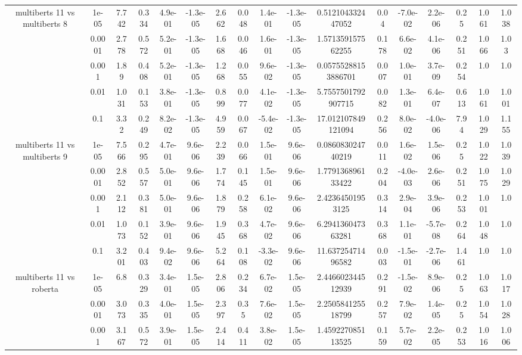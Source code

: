 \begin{tabular}{|c|c|c|c|c|c|c|c|c|c|c|c|c|c|c|c|c|}
\hline
\multirow{5}{*}{multiberts 11 vs multiberts 8} & 1e-05 & 7.742 & 0.334 & 4.9e-01 & -1.3e-05 & 2.662 & 0.048 & 1.4e-01 & -1.3e-05 & 0.512104332447052 & 0.04 & -7.0e-02 & 2.2e-06 & 0.25 & 1.061 & 1.038 \\
 & 0.0001 & 2.778 & 0.572 & 5.2e-01 & -1.3e-05 & 1.668 & 0.046 & 1.6e-01 & -1.3e-05 & 1.571359157562255 & 0.178 & 6.6e-02 & 4.1e-06 & 0.251 & 1.066 & 1.03 \\
 & 0.001 & 1.89 & 0.408 & 5.2e-01 & -1.3e-05 & 1.268 & 0.055 & 9.6e-02 & -1.3e-05 & 0.05755288153886701 & 0.007 & 1.0e-01 & 3.7e-09 & 0.254 & 1.0 & 1.0 \\
 & 0.01 & 1.031 & 0.153 & 3.8e-01 & -1.3e-05 & 0.899 & 0.077 & 4.1e-02 & -1.3e-05 & 5.7557501792907715 & 0.082 & 1.3e-01 & 6.4e-07 & 0.613 & 1.061 & 1.001 \\
 & 0.1 & 3.32 & 0.249 & 8.2e-02 & -1.3e-05 & 4.959 & 0.067 & -5.4e-02 & -1.3e-05 & 17.012107849121094 & 0.256 & 8.0e-02 & -4.0e-06 & 7.94 & 1.029 & 1.155 \\
\hline
\multirow{5}{*}{multiberts 11 vs multiberts 9} & 1e-05 & 7.566 & 0.295 & 4.7e-01 & 9.6e-06 & 2.239 & 0.066 & 1.5e-01 & 9.6e-06 & 0.086083024740219 & 0.011 & 1.6e-02 & 1.5e-06 & 0.25 & 1.022 & 1.039 \\
 & 0.0001 & 2.852 & 0.557 & 5.0e-01 & 9.6e-06 & 1.774 & 0.145 & 1.5e-01 & 9.6e-06 & 1.779136896133422 & 0.204 & -4.0e-03 & 2.6e-06 & 0.251 & 1.075 & 1.029 \\
 & 0.001 & 2.112 & 0.381 & 5.0e-01 & 9.6e-06 & 1.879 & 0.258 & 6.1e-02 & 9.6e-06 & 2.42364501953125 & 0.314 & 2.9e-04 & 3.9e-06 & 0.253 & 1.001 & 1.0 \\
 & 0.01 & 1.073 & 0.152 & 3.9e-01 & 9.6e-06 & 1.945 & 0.368 & 4.7e-02 & 9.6e-06 & 6.294136047363281 & 0.368 & 1.1e-01 & -5.7e-08 & 0.264 & 1.048 & 1.0 \\
 & 0.1 & 3.201 & 0.403 & 9.4e-02 & 9.6e-06 & 5.264 & 0.108 & -3.3e-02 & 9.6e-06 & 11.63725471496582 & 0.003 & -1.5e-01 & -2.7e-06 & 1.461 & 1.0 & 1.0 \\
\hline
\multirow{5}{*}{multiberts 11 vs roberta } & 1e-05 & 6.8 & 0.329 & 3.4e-01 & 1.5e-05 & 2.806 & 0.234 & 6.7e-02 & 1.5e-05 & 2.446602344512939 & 0.291 & -1.5e-02 & 8.9e-06 & 0.25 & 1.063 & 1.017 \\
 & 0.0001 & 3.073 & 0.335 & 4.0e-01 & 1.5e-05 & 2.397 & 0.35 & 7.6e-02 & 1.5e-05 & 2.250584125518799 & 0.257 & 7.9e-02 & 1.4e-05 & 0.25 & 1.054 & 1.028 \\
 & 0.001 & 3.167 & 0.572 & 3.9e-01 & 1.5e-05 & 2.414 & 0.411 & 3.8e-02 & 1.5e-05 & 1.459227085113525 & 0.159 & 5.7e-02 & 2.2e-05 & 0.253 & 1.016 & 1.006 \\

\end{tabular}
